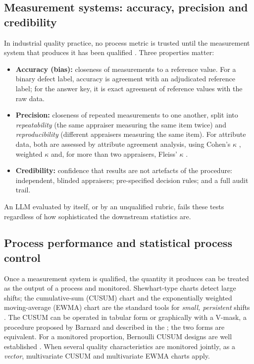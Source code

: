 \documentclass[11pt]{article}
\begin{document}
\subsection{Measurement systems: accuracy, precision and credibility}
In industrial quality practice, no process metric is trusted until the measurement system that produces it has been qualified \citep{aiag2010msa}. Three properties matter:
\begin{itemize}[leftmargin=*]
\item \textbf{Accuracy (bias):} closeness of measurements to a reference value. For a binary defect label, accuracy is agreement with an adjudicated reference label; for the answer key, it is exact agreement of reference values with the raw data.
\item \textbf{Precision:} closeness of repeated measurements to one another, split into \emph{repeatability} (the same appraiser measuring the same item twice) and \emph{reproducibility} (different appraisers measuring the same item). For attribute data, both are assessed by attribute agreement analysis, using Cohen's $\kappa$ \citep{cohen1960}, weighted $\kappa$ \citep{cohen1968} and, for more than two appraisers, Fleiss' $\kappa$ \citep{fleiss1971}.
\item \textbf{Credibility:} confidence that results are not artefacts of the procedure: independent, blinded appraisers; pre-specified decision rules; and a full audit trail.
\end{itemize}
An LLM evaluated by itself, or by an unqualified rubric, fails these tests regardless of how sophisticated the downstream statistics are.

\subsection{Process performance and statistical process control}
Once a measurement system is qualified, the quantity it produces can be treated as the output of a process and monitored. Shewhart-type charts detect large shifts; the cumulative-sum (CUSUM) chart \citep{page1954} and the exponentially weighted moving-average (EWMA) chart \citep{roberts1959,lucas1990} are the standard tools for \emph{small, persistent} shifts \citep{montgomery2019}. The CUSUM can be operated in tabular form or graphically with a V-mask, a procedure proposed by Barnard and described in the \citet{nist}; the two forms are equivalent. For a monitored proportion, Bernoulli CUSUM designs are well established \citep{reynolds1999}. When several quality characteristics are monitored jointly, as a \emph{vector}, multivariate CUSUM \citep{crosier1988} and multivariate EWMA \citep{lowry1992} charts apply.
\end{document}
